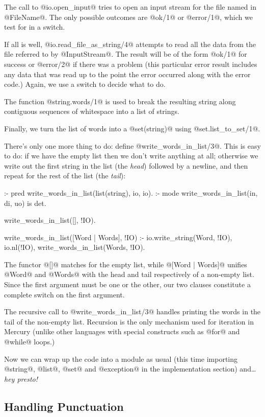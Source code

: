 The call to @io.open_input@ tries to open an input stream for the file
named in @FileName@.  
The only possible outcomes are @ok/1@ or @error/1@, which
we test for in a switch.

If all is well, @io.read_file_as_string/4@ attempts to read all the data
from the file referred to by @InputStream@.  The result will be of the form
@ok/1@ for success or @error/2@ if there was a problem (this particular
error result includes any data that was read up to the point the error
occurred along with the error code.)  Again, we use a switch to decide what
to do.

The function @string.words/1@ is used to break the resulting string along
contiguous sequences of whitespace into a list of strings.

Finally, we turn the list of words into a @set(string)@ using
@set.list_to_set/1@.

There's only one more thing to do: define @write_words_in_list/3@.
This is easy to do: if we have the empty list then we don't write
anything at all; otherwise we write out the first string in the list
(the \emph{head}) followed by a newline, and then repeat for the rest of
the list (the \emph{tail}):
\begin{myverbatim}
:- pred write_words_in_list(list(string), io, io).
:- mode write_words_in_list(in,           di, uo) is det.

write_words_in_list([],             !IO).

write_words_in_list([Word | Words], !IO) :-
    io.write_string(Word, !IO),
    io.nl(!IO),
    write_words_in_list(Words, !IO).
\end{myverbatim}
The functor @[]@ matches for the empty list, while @[Word | Words]@
unifies @Word@ and @Words@ with the head and tail respectively of a
non-empty list.  Since the first argument must be one or the other, our two
clauses constitute a complete switch on the first argument.

The recursive call to @write_words_in_list/3@ handles printing the words
in the tail of the non-empty list.  Recursion is the only mechanism used for
iteration in Mercury (unlike other languages with special constructs such as
@for@ and @while@ loops.)

Now we can wrap up the code into a module as usual (this time importing
@string@, @list@, @set@ and @exception@ in the implementation section)
and\ldots \emph{hey presto!}

\subsection{Handling Punctuation}

